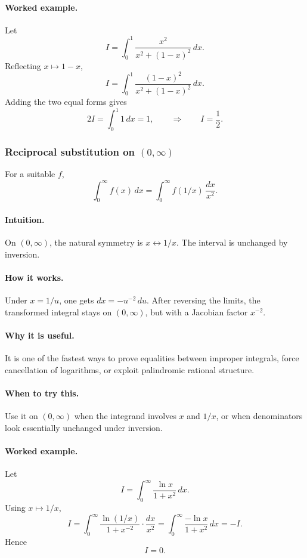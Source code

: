 \documentclass[12pt]{article}
\begin{document}
\paragraph{Worked example.}
Let
\[
I=\int_0^1 \frac{x^2}{x^2+(1-x)^2}\,dx.
\]
Reflecting \(x\mapsto 1-x\),
\[
I=\int_0^1 \frac{(1-x)^2}{x^2+(1-x)^2}\,dx.
\]
Adding the two equal forms gives
\[
2I=\int_0^1 1\,dx=1,
\qquad\Rightarrow\qquad
I=\frac12.
\]

\newpage
\subsubsection{Reciprocal substitution on \((0,\infty)\)}
For a suitable \(f\),
\[
\int_0^\infty f(x)\,dx=\int_0^\infty f(1/x)\,\frac{dx}{x^2}.
\]

\paragraph{Intuition.}
On \((0,\infty)\), the natural symmetry is \(x\leftrightarrow 1/x\). The interval is unchanged by inversion.

\paragraph{How it works.}
Under \(x=1/u\), one gets \(dx=-u^{-2}\,du\). After reversing the limits, the transformed integral stays on \((0,\infty)\), but with a Jacobian factor \(x^{-2}\).

\paragraph{Why it is useful.}
It is one of the fastest ways to prove equalities between improper integrals, force cancellation of logarithms, or exploit palindromic rational structure.

\paragraph{When to try this.}
Use it on \((0,\infty)\) when the integrand involves \(x\) and \(1/x\), or when denominators look essentially unchanged under inversion.

\paragraph{Worked example.}
Let
\[
I=\int_0^\infty \frac{\ln x}{1+x^2}\,dx.
\]
Using \(x\mapsto 1/x\),
\[
I=\int_0^\infty \frac{\ln(1/x)}{1+x^{-2}}\cdot \frac{dx}{x^2}
=\int_0^\infty \frac{-\ln x}{1+x^2}\,dx=-I.
\]
Hence
\[
I=0.
\]
\end{document}
